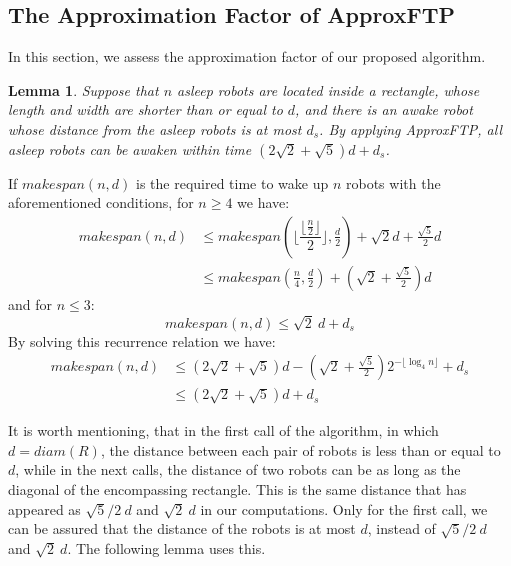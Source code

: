\documentclass[review]{elsarticle}
\newtheorem{lemma}[theorem]{Lemma}
\def\QED{\ensuremath{{\square}}}
\def\markatright#1{\leavevmode\unskip\nobreak\quad\hspace*{\fill}{#1}}
\newenvironment{proof}
{\begin{trivlist}\item[\hskip\labelsep{\bf Proof.}]}
  {\markatright{\QED}\end{trivlist}}
\begin{document}
\subsection{The Approximation Factor of ApproxFTP}
In this section, we assess the approximation factor of our proposed algorithm.

\begin{lemma}
\label{lem:1}
Suppose that $n$ asleep robots are located inside a rectangle, whose length and width are shorter than or equal to $d$, and there is an awake robot whose distance from the asleep robots is at most $d_s$. By applying \textit{ApproxFTP}, all asleep robots can be awaken within time ${ (2\sqrt{2}+\sqrt{5})d+d_s }$.
\end{lemma}
\begin{proof}
If $makespan(n,d)$ is the required time to wake up $n$ robots with the aforementioned conditions, for $n\geq4$ we have:
\begin{align}
makespan(n,d) &\leq makespan(\bigg\lfloor \dfrac{\lfloor\frac{n}{2}\rfloor}{2} \bigg\rfloor, \frac{d}{2})+\!\sqrt{2}d+\!\frac{\sqrt{5}}{2}d \nonumber\\
				&\leq makespan(\frac{n}{4}, \frac{d}{2})+(\sqrt{2}+\frac{\sqrt{5}}{2})d \nonumber
\end{align}
and for $n\le3$:
$$ makespan(n,d) \leq \sqrt{2} ~d+d_s $$
By solving this recurrence relation we have:
\begin{align}
makespan(n,d) &\leq (2\sqrt{2}+\!\sqrt{5})d-\!(\sqrt{2}+\!\frac{\sqrt{5}}{2}) 2^{-\!\lfloor\log_4n \rfloor}+d_s \nonumber\\
				&\leq (2\sqrt{2}+\!\sqrt{5})d+d_s \nonumber
\end{align}
\end{proof}
It is worth mentioning, that in the first call of the algorithm, in which $d=diam(R)$, the distance between each pair of robots is less than or equal to $d$, while in the next calls, the distance of two robots can be as long as the diagonal of the encompassing rectangle. This is the same distance that has appeared as $\sqrt{5}/2~d$ and $\sqrt{2}~d$ in our computations. Only for the first call, we can be assured that the distance of the robots is at most $d$, instead of $\sqrt{5}/2~d$ and $\sqrt{2}~d$. The following lemma uses this.
\end{document}
